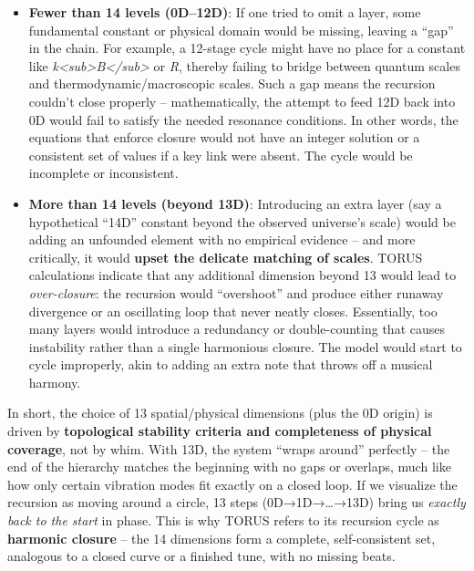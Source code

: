 \documentclass[]{article}
\begin{document}
{\begin{itemize}
\item
  \textbf{Fewer than 14 levels (0D--12D)}: If one tried to omit a layer,
  some fundamental constant or physical domain would be missing, leaving
  a ``gap'' in the chain. For example, a 12-stage cycle might have no
  place for a constant like
  \emph{k\textless{}sub\textgreater{}B\textless{}/sub\textgreater{}} or
  \emph{R}, thereby failing to bridge between quantum scales and
  thermodynamic/macroscopic scales​. Such a gap means the recursion
  couldn't close properly -- mathematically, the attempt to feed 12D
  back into 0D would fail to satisfy the needed resonance conditions. In
  other words, the equations that enforce closure would not have an
  integer solution or a consistent set of values if a key link were
  absent​. The cycle would be incomplete or inconsistent.
\item
  \textbf{More than 14 levels (beyond 13D)}: Introducing an extra layer
  (say a hypothetical ``14D'' constant beyond the observed universe's
  scale) would be adding an unfounded element with no empirical evidence
  -- and more critically, it would \textbf{upset the delicate matching
  of scales}. TORUS calculations indicate that any additional dimension
  beyond 13 would lead to \emph{over-closure}: the recursion would
  ``overshoot'' and produce either runaway divergence or an oscillating
  loop that never neatly closes​. Essentially, too many layers would
  introduce a redundancy or double-counting that causes instability
  rather than a single harmonious closure. The model would start to
  cycle improperly, akin to adding an extra note that throws off a
  musical harmony.
\end{itemize}

In short, the choice of 13 spatial/physical dimensions (plus the 0D
origin) is driven by \textbf{topological stability criteria and
completeness of physical coverage}, not by whim​. With 13D, the system
``wraps around'' perfectly -- the end of the hierarchy matches the
beginning with no gaps or overlaps, much like how only certain vibration
modes fit exactly on a closed loop​. If we visualize the recursion as
moving around a circle, 13 steps (0D→1D→\ldots{}→13D) bring us
\emph{exactly back to the start} in phase. This is why TORUS refers to
its recursion cycle as \textbf{harmonic closure} -- the 14 dimensions
form a complete, self-consistent set, analogous to a closed curve or a
finished tune, with no missing beats.

}
\end{document}
